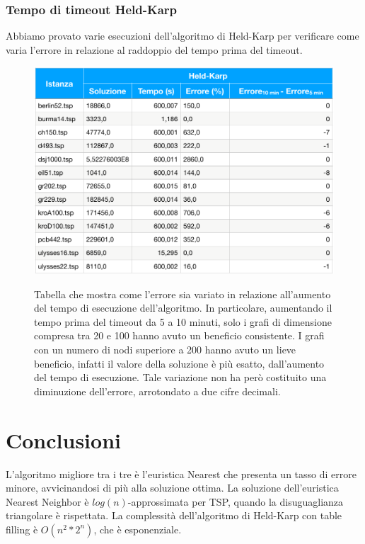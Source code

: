 \documentclass[a4paper]{article}
\begin{document}
\subsubsection{Tempo di timeout Held-Karp}
Abbiamo provato varie esecuzioni dell'algoritmo di Held-Karp per verificare come varia l'errore in relazione al raddoppio del tempo prima del timeout.
\begin{figure}[H]
	\centering
	\includegraphics[width=0.5\linewidth]{differenze_errori}
	\label{fig:timeouttiming}
	\caption{Tabella che mostra come l'errore sia variato in relazione all'aumento del tempo di esecuzione dell'algoritmo. In particolare, aumentando il tempo prima del timeout da 5 a 10 minuti, solo i grafi di dimensione compresa tra 20 e 100 hanno avuto un beneficio consistente. I grafi con un numero di nodi superiore a 200 hanno avuto un lieve beneficio, infatti il valore della soluzione è più esatto, dall'aumento del tempo di esecuzione. Tale variazione non ha però costituito una diminuzione dell'errore, arrotondato a due cifre decimali.}
\end{figure}

\section{Conclusioni}
L'algoritmo migliore tra i tre è l'euristica Nearest che presenta un tasso di errore minore, avvicinandosi di più alla soluzione ottima. La soluzione dell'euristica Nearest Neighbor è $log(n)$-approssimata per TSP, quando la disuguaglianza triangolare è rispettata. La complessità dell'algoritmo di Held-Karp con table filling è $O(n^2*2^n)$, che è esponenziale. 
\end{document}
